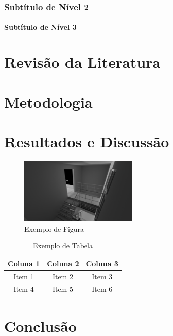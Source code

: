 \documentclass[12pt,a4paper,oneside,brazil]{abntex2}
\begin{document}
\subsection{Subtítulo de Nível 2}
\lipsum[4]
\subsubsection{Subtítulo de Nível 3}
\lipsum[5]
\lipsum[5]

\chapter{Revisão da Literatura}
\lipsum[6-7]

\chapter{Metodologia}
\lipsum[8-9]

\chapter{Resultados e Discussão}
\lipsum[10]

\begin{figure}[ht]
\centering
\includegraphics[width=0.5\textwidth]{./src/assets/untitled.png}
\caption{Exemplo de Figura}
\label{fig:exemplo}
\end{figure}

\begin{table}[ht]
\centering
\begin{tabular}{|c|c|c|}
\hline
Coluna 1 & Coluna 2 & Coluna 3 \\ \hline
Item 1   & Item 2   & Item 3   \\ \hline
Item 4   & Item 5   & Item 6   \\ \hline
\end{tabular}
\caption{Exemplo de Tabela}
\label{tab:exemplo}
\end{table}

\chapter{Conclusão}
\lipsum[11-12]


\end{document}
